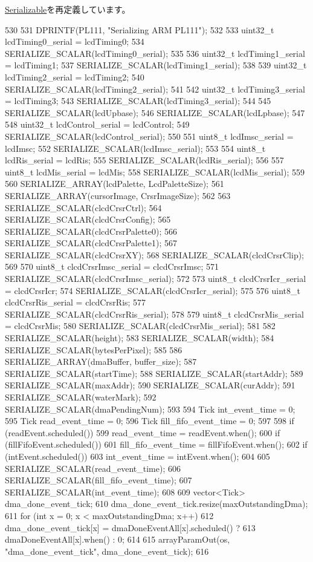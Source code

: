 \hyperlink{classSerializable_ad6272f80ae37e8331e3969b3f072a801}{Serializable}を再定義しています。


\begin{DoxyCode}
530 {
531     DPRINTF(PL111, "Serializing ARM PL111\n");
532 
533     uint32_t lcdTiming0_serial = lcdTiming0;
534     SERIALIZE_SCALAR(lcdTiming0_serial);
535 
536     uint32_t lcdTiming1_serial = lcdTiming1;
537     SERIALIZE_SCALAR(lcdTiming1_serial);
538 
539     uint32_t lcdTiming2_serial = lcdTiming2;
540     SERIALIZE_SCALAR(lcdTiming2_serial);
541 
542     uint32_t lcdTiming3_serial = lcdTiming3;
543     SERIALIZE_SCALAR(lcdTiming3_serial);
544 
545     SERIALIZE_SCALAR(lcdUpbase);
546     SERIALIZE_SCALAR(lcdLpbase);
547 
548     uint32_t lcdControl_serial = lcdControl;
549     SERIALIZE_SCALAR(lcdControl_serial);
550 
551     uint8_t lcdImsc_serial = lcdImsc;
552     SERIALIZE_SCALAR(lcdImsc_serial);
553 
554     uint8_t lcdRis_serial = lcdRis;
555     SERIALIZE_SCALAR(lcdRis_serial);
556 
557     uint8_t lcdMis_serial = lcdMis;
558     SERIALIZE_SCALAR(lcdMis_serial);
559 
560     SERIALIZE_ARRAY(lcdPalette, LcdPaletteSize);
561     SERIALIZE_ARRAY(cursorImage, CrsrImageSize);
562 
563     SERIALIZE_SCALAR(clcdCrsrCtrl);
564     SERIALIZE_SCALAR(clcdCrsrConfig);
565     SERIALIZE_SCALAR(clcdCrsrPalette0);
566     SERIALIZE_SCALAR(clcdCrsrPalette1);
567     SERIALIZE_SCALAR(clcdCrsrXY);
568     SERIALIZE_SCALAR(clcdCrsrClip);
569 
570     uint8_t clcdCrsrImsc_serial = clcdCrsrImsc;
571     SERIALIZE_SCALAR(clcdCrsrImsc_serial);
572 
573     uint8_t clcdCrsrIcr_serial = clcdCrsrIcr;
574     SERIALIZE_SCALAR(clcdCrsrIcr_serial);
575 
576     uint8_t clcdCrsrRis_serial = clcdCrsrRis;
577     SERIALIZE_SCALAR(clcdCrsrRis_serial);
578 
579     uint8_t clcdCrsrMis_serial = clcdCrsrMis;
580     SERIALIZE_SCALAR(clcdCrsrMis_serial);
581 
582     SERIALIZE_SCALAR(height);
583     SERIALIZE_SCALAR(width);
584     SERIALIZE_SCALAR(bytesPerPixel);
585 
586     SERIALIZE_ARRAY(dmaBuffer, buffer_size);
587     SERIALIZE_SCALAR(startTime);
588     SERIALIZE_SCALAR(startAddr);
589     SERIALIZE_SCALAR(maxAddr);
590     SERIALIZE_SCALAR(curAddr);
591     SERIALIZE_SCALAR(waterMark);
592     SERIALIZE_SCALAR(dmaPendingNum);
593 
594     Tick int_event_time = 0;
595     Tick read_event_time = 0;
596     Tick fill_fifo_event_time = 0;
597 
598     if (readEvent.scheduled())
599         read_event_time = readEvent.when();
600     if (fillFifoEvent.scheduled())
601         fill_fifo_event_time = fillFifoEvent.when();
602     if (intEvent.scheduled())
603         int_event_time = intEvent.when();
604 
605     SERIALIZE_SCALAR(read_event_time);
606     SERIALIZE_SCALAR(fill_fifo_event_time);
607     SERIALIZE_SCALAR(int_event_time);
608 
609     vector<Tick> dma_done_event_tick;
610     dma_done_event_tick.resize(maxOutstandingDma);
611     for (int x = 0; x < maxOutstandingDma; x++) {
612         dma_done_event_tick[x] = dmaDoneEventAll[x].scheduled() ?
613             dmaDoneEventAll[x].when() : 0;
614     }
615     arrayParamOut(os, "dma_done_event_tick", dma_done_event_tick);
616 }
\end{DoxyCode}
